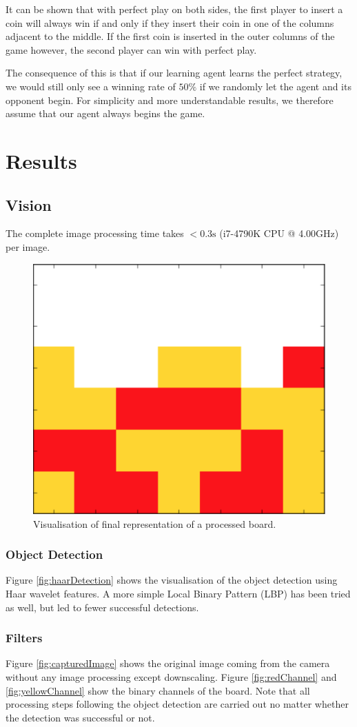 \documentclass[10pt,twocolumn,letterpaper]{article}
\begin{document}
It can be shown that with perfect play on both sides, the first player to insert a coin will always win if and only if they insert their coin in one of the columns adjacent to the middle.
If the first coin is inserted in the outer columns of the game however, the second player can win with perfect play.

The consequence of this is that if our learning agent learns the perfect strategy, we would still only see a winning rate of $50\%$ if we randomly
let the agent and its opponent begin.
For simplicity and more understandable results, we therefore assume that our agent always begins the game.

\section{Results}

\subsection{Vision}
The complete image processing time takes $< 0.3\mathrm{s}$ (i7-4790K CPU @ 4.00GHz) per image.
\begin{figure}[bh]
  \centering
  \includegraphics[width = .3\textwidth]{figures/finalBoard.png}
  \caption{Visualisation of final representation of a processed board.}
  \label{fig:final}
\end{figure}

\subsubsection{Object Detection}
Figure \ref{fig:haarDetection} shows the visualisation of the object detection using Haar wavelet features.
A more simple Local Binary Pattern (LBP) has been tried as well, but led to fewer successful detections.

\subsubsection{Filters}
Figure \ref{fig:capturedImage} shows the original image coming from the camera without any image processing except downscaling.
Figure \ref{fig:redChannel} and \ref{fig:yellowChannel} show the binary channels of the board.
Note that all processing steps following the object detection are carried out no matter whether the detection was successful or not.
\end{document}

